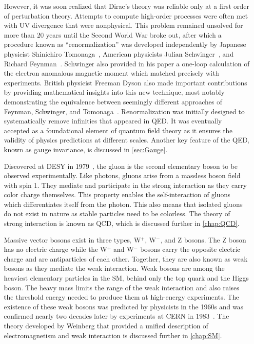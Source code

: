 However, it was soon realized that Dirac's theory was reliable only at a first order of perturbation theory. Attempts to compute high-order processes were often met with \ac{UV} divergence that were nonphysical. This problem remained unsolved for more than 20 years until the Second World War broke out, after which a procedure known as ``renormalization'' was developed independently by Japanese physicist Shinichiro Tomonaga~\cite{Tomonaga:1946zz}, American physicists Julian Schwinger~\cite{Schwinger:1948iu}, and Richard Feynman~\cite{Feynman:1950ir}. Schwinger also provided in his paper a one-loop calculation of the electron anomalous magnetic moment which matched precisely with experiments. British physicist Freeman Dyson also made important contributions by providing mathematical insights into this new technique, most notably demonstrating the equivalence between seemingly different approaches of Feynman, Schwinger, and Tomonaga~\cite{Dyson:1949bp}. Renormalization was initially designed to systematically remove infinities that appeared in \ac{QED}. It was eventually accepted as a foundational element of quantum field theory as it ensures the validity of physics predictions at different scales. Another key feature of the \ac{QED}, known as gauge invariance, is discussed in \autoref{sec:Gauge}.

Discovered at DESY in 1979~\cite{TASSO:1979zyf}, the gluon is the second elementary boson to be observed experimentally. Like photons, gluons arise from a massless boson field with spin 1. They mediate and participate in the strong interaction as they carry color charge themselves. This property enables the self-interaction of gluons which differentiates itself from the photon. This also means that isolated gluons do not exist in nature as stable particles need to be colorless. The theory of strong interaction is known as \ac{QCD}, which is discussed further in \autoref{chap:QCD}.

Massive vector bosons exist in three types, W$^{+}$, W$^{-}$, and Z bosons. The Z boson has no electric charge while the W$^{+}$ and W$^{-}$ bosons carry the opposite electric charge and are antiparticles of each other. Together, they are also known as weak bosons as they mediate the weak interaction. Weak bosons are among the heaviest elementary particles in the \ac{SM}, behind only the top quark and the Higgs boson. The heavy mass limits the range of the weak interaction and also raises the threshold energy needed to produce them at high-energy experiments. The existence of these weak bosons was predicted by physicists in the 1960s and was confirmed nearly two decades later by experiments at \ac{CERN} in 1983~\cite{UA1:1983crd,UA2:1983tsx,UA1:1983mne,UA2:1983mlz}. The theory developed by Weinberg that provided a unified description of electromagnetism and weak interaction is discussed further in \autoref{chap:SM}.

